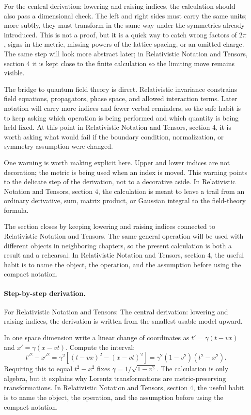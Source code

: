 For the central derivation: lowering and raising indices, the calculation should also pass a dimensional check.  The left and right sides must carry the same units; more subtly, they must transform in the same way under the symmetries already introduced.  This is not a proof, but it is a quick way to catch wrong factors of \(2\pi\), signs in the metric, missing powers of the lattice spacing, or an omitted charge.  The same step will look more abstract later; in Relativistic Notation and Tensors, section 4 it is kept close to the finite calculation so the limiting move remains visible.

The bridge to quantum field theory is direct.  Relativistic invariance constrains field equations, propagators, phase space, and allowed interaction terms.  Later notation will carry more indices and fewer verbal reminders, so the safe habit is to keep asking which operation is being performed and which quantity is being held fixed.  At this point in Relativistic Notation and Tensors, section 4, it is worth asking what would fail if the boundary condition, normalization, or symmetry assumption were changed.

One warning is worth making explicit here.  Upper and lower indices are not decoration; the metric is being used when an index is moved.  This warning points to the delicate step of the derivation, not to a decorative aside.  In Relativistic Notation and Tensors, section 4, the calculation is meant to leave a trail from an ordinary derivative, sum, matrix product, or Gaussian integral to the field-theory formula.

The section closes by keeping lowering and raising indices connected to Relativistic Notation and Tensors.  The same general operation will be used with different objects in neighboring chapters, so the present calculation is both a result and a rehearsal.  In Relativistic Notation and Tensors, section 4, the useful habit is to name the object, the operation, and the assumption before using the compact notation.



\paragraph{Step-by-step derivation.}

For Relativistic Notation and Tensors: The central derivation: lowering and raising indices, the derivation is written from the smallest usable model upward.

In one space dimension write a linear change of coordinates as \(t'=\gamma(t-vx)\) and \(x'=\gamma(x-vt)\).  Compute the interval:
\[
  t'^2-x'^2
  =
  \gamma^2[(t-vx)^2-(x-vt)^2]
  =
  \gamma^2(1-v^2)(t^2-x^2).
\]
Requiring this to equal \(t^2-x^2\) fixes \(\gamma=1/\sqrt{1-v^2}\).  The calculation is only algebra, but it explains why Lorentz transformations are metric-preserving transformations.  In Relativistic Notation and Tensors, section 4, the useful habit is to name the object, the operation, and the assumption before using the compact notation.

